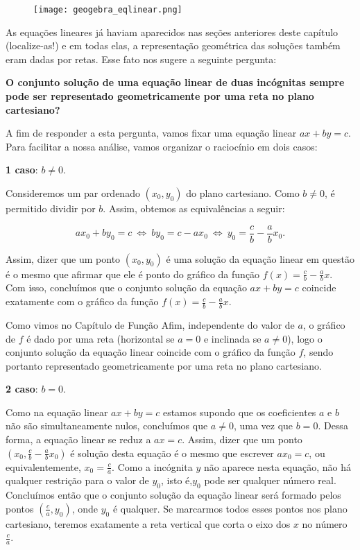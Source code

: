 \begin{figure}[H]
\centering

\noindent\texttt{[image: geogebra\_eqlinear.png]}
\end{figure}
\vspace{-2em}

As equações lineares já haviam aparecidos nas seções anteriores deste capítulo (localize-as!) e em todas elas, a representação geométrica das soluções também eram dadas por retas. Esse fato nos sugere a seguinte pergunta:	


\begin{observation}

\textbf{O conjunto solução de uma equação linear de duas incógnitas sempre pode ser representado geometricamente por uma reta no plano cartesiano?}


A fim de responder a esta pergunta, vamos fixar uma equação linear $ax + by = c$. Para facilitar a nossa análise, vamos organizar o raciocínio em dois casos:

\textbf{1 caso}: $b\neq 0$.  

Consideremos um par ordenado $(x_0,y_0)$ do plano cartesiano. Como $b \neq 0$, é permitido dividir por $b$. Assim, obtemos as equivalências a seguir:

$$
ax_0+by_0=c \ \Leftrightarrow \ by_0=c-ax_0 \ \Leftrightarrow \ y_0=\frac{c}{b}-\frac{a}{b}x_0.
$$

Assim, dizer que um ponto $(x_0,y_0)$ é uma solução da equação linear em questão é o mesmo que afirmar que ele é ponto do gráfico da função $f(x)=\frac{c}{b}-\frac{a}{b}x$. Com isso, concluímos que o conjunto solução da equação $ax+by=c$ coincide exatamente com o gráfico da função $f(x)=\frac{c}{b}-\frac{a}{b}x$.
	

Como vimos no Capítulo de Função Afim, independente do valor de $a$, o gráfico de $f$ é dado por uma reta (horizontal se $a =0$ e inclinada se $a\neq 0$), logo o conjunto solução da equação linear coincide com o gráfico da função $f$, sendo portanto representado geometricamente por uma reta no plano cartesiano.


\textbf{2 caso}: $b=0$.  

Como na equação linear $ax + by = c$ estamos supondo que os coeficientes $a$ e $b$ não são simultaneamente nulos, concluímos que $a\neq0$, uma vez que $b=0$. Dessa forma, a equação linear se reduz a $ax = c$. Assim, dizer que um ponto $(x_0,\frac{c}{b}-\frac{a}{b}x_0)$ é solução desta equação é o mesmo que escrever $ax_0=c$, ou equivalentemente, $x_0=\frac{c}{a}$. Como a incógnita $y$ não aparece nesta equação, não há qualquer restrição para o valor de $y_0$, isto é,$y_0$ pode ser qualquer número real. Concluímos então que o conjunto solução da equação linear será formado pelos pontos $(\frac{c}{a},y_0)$, onde $ y_0$ é qualquer. Se marcarmos todos esses pontos nos plano cartesiano, teremos exatamente a reta vertical que corta o eixo dos $x$ no número $\frac{c}{a}$.


\end{observation}
